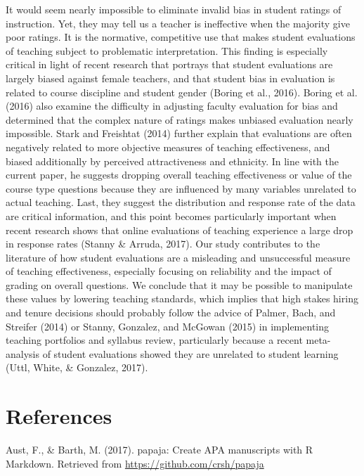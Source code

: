 \documentclass[,man,mask]{apa6}
\begin{document}
It would seem nearly impossible to eliminate invalid bias in student ratings of instruction. Yet, they may tell us a teacher is ineffective when the majority give poor ratings. It is the normative, competitive use that makes student evaluations of teaching subject to problematic interpretation. This finding is especially critical in light of recent research that portrays that student evaluations are largely biased against female teachers, and that student bias in evaluation is related to course discipline and student gender (Boring et al., 2016). Boring et al. (2016) also examine the difficulty in adjusting faculty evaluation for bias and determined that the complex nature of ratings makes unbiased evaluation nearly impossible. Stark and Freishtat (2014) further explain that evaluations are often negatively related to more objective measures of teaching effectiveness, and biased additionally by perceived attractiveness and ethnicity. In line with the current paper, he suggests dropping overall teaching effectiveness or value of the course type questions because they are influenced by many variables unrelated to actual teaching. Last, they suggest the distribution and response rate of the data are critical information, and this point becomes particularly important when recent research shows that online evaluations of teaching experience a large drop in response rates (Stanny \& Arruda, 2017). Our study contributes to the literature of how student evaluations are a misleading and unsuccessful measure of teaching effectiveness, especially focusing on reliability and the impact of grading on overall questions. We conclude that it may be possible to manipulate these values by lowering teaching standards, which implies that high stakes hiring and tenure decisions should probably follow the advice of Palmer, Bach, and Streifer (2014) or Stanny, Gonzalez, and McGowan (2015) in implementing teaching portfolios and syllabus review, particularly because a recent meta-analysis of student evaluations showed they are unrelated to student learning (Uttl, White, \& Gonzalez, 2017).

\newpage

\hypertarget{references}{%
\section{References}\label{references}}

\setlength{\parindent}{-0.5in}
\setlength{\leftskip}{0.5in}

\hypertarget{refs}{}
\leavevmode\hypertarget{ref-Aust2017}{}%
Aust, F., \& Barth, M. (2017). papaja: Create APA manuscripts with R Markdown. Retrieved from \url{https://github.com/crsh/papaja}
\end{document}
